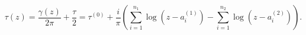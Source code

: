 \begin{equation}
\tau(z)=\frac{\gamma (z)}{2\pi}+\frac{\tau}{2}=
\tau^{(0)}+ \frac{i}{\pi}\left (\sum_{i=1}^{n_1}\log (z-a_i^{(1)})-
\sum_{i=1}^{n_2}\log (z-a_i^{(2)})\right ). 
\label{probe}
\end{equation}

